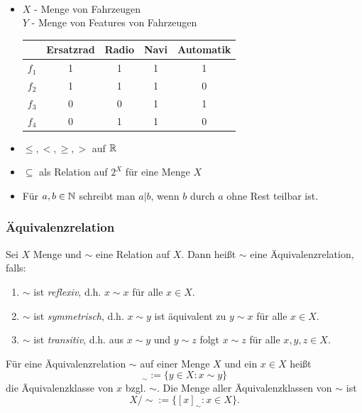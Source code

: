 \begin{bsp}\ %
\begin{itemize}
	\item $ X $ - Menge von Fahrzeugen\\
	$ Y $ - Menge von Features von Fahrzeugen
\begin{center}
	\begin{tabular}{l|c|c|c|c}
		& Ersatzrad & Radio & Navi & Automatik \\
		\hline
		$ f_1 $ & 1 & 1 & 1 & 1 \\
		$ f_2 $ & 1 & 1 & 1 & 0 \\
		$ f_3 $ & 0 & 0 & 1 & 1 \\
		$ f_4 $ & 0 & 1 & 1 & 0
	\end{tabular}
\end{center}
	\item $ \leq, <, \geq, > $ auf $ \mathbb R $
	\item $ \subseteq $ als Relation auf $ 2^X $ für eine Menge $ X $
	\item Für $ a,b \in \mathbb N $ schreibt man $ a | b $, wenn $ b $ durch $ a $ ohne Rest teilbar ist.
\end{itemize}
\end{bsp}

\subsubsection{Äquivalenzrelation}

Sei $ X $ Menge und $ \sim $ eine Relation auf $ X $. Dann heißt $ \sim $ eine Äquivalenzrelation, falls:
\begin{enumerate}
	\item $ \sim $ ist \emph{reflexiv}, d.h. $ x \sim x $ für alle $ x \in X $.
	\item $ \sim $ ist \emph{symmetrisch}, d.h. $ x \sim y $ ist äquivalent zu $ y \sim x $ für alle $ x \in X $.
	\item $ \sim $ ist \emph{transitiv}, d.h. aus $ x \sim y $ und $ y \sim z $ folgt $ x \sim z $ für alle $ x,y,z \in X $.
\end{enumerate}
Für eine Äquivalenzrelation $ \sim $ auf einer Menge $ X $ und ein $ x \in X $ heißt
\begin{equation*}
	[x]_\sim := \{ y \in X : x \sim y \}
\end{equation*}
die Äquivalenzklasse von $ x $ bzgl. $ \sim $. Die Menge aller Äquivalenzklassen von $ \sim $ ist
\begin{equation*}
	X/{\sim} := \{ [x]_\sim : x \in X \}. %
\end{equation*}

